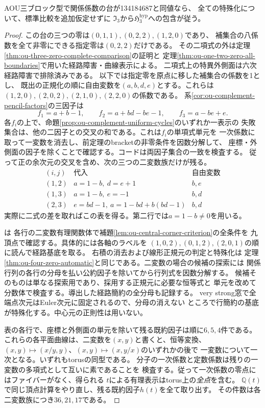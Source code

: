 \begin{theorem}
\label{thm:ou-three-zero-double-pencils}
AOU三ブロック型で関係係数の台が134184687と同値なら、
全ての特殊化について、標準比較を追加仮定せずに
$\mathfrak I_3$から$\mathfrak H^{\mathrm{hyp}}_3$への包含が従う。
\end{theorem}
\begin{proof}
この台の三つの零は$(0,1,1),(0,2,2),(1,2,0)$であり、
補集合の八係数を全て非零にできる指定零は$(0,2,2)$だけである。
その二項式の外は定理\ref{thm:ou-three-zero-complete-comparison}の証明と
定理\ref{thm:ou-one-two-zero-all-boundaries}で用いた経路障害・曲線表示による。
二項式上の特異外側面は六次経路障害で排除済みである。
以下では指定零を原点に移した補集合の係数を1とし、
既出の正規化の順に自由変数を$(a,b,d,e)$とする。これらは
$(1,2,0),(2,0,2),(2,1,0),(2,2,0)$の係数である。
系\ref{cor:ou-complement-pencil-factors}の三因子は
\[
 f_1=a+b-1,\qquad f_2=a+bd-be-1,\qquad f_3=a-be+e.
\]
各$f_i$の上で、命題\ref{prop:ou-complement-uniform-cycles}のいずれか一表示の
失敗集合は、他の二因子との交叉の和である。これは$f_i$の単項式単元を
一次係数に取って一変数を消去し、前定理のbracketの非零条件を因数分解して、
座標・外側面の因子を除くことで確認する。コードは両因子集合の一致を検査する。
従って正の余次元の交叉を含め、次の三つの二変数族だけが残る。
\[
\begin{array}{c|c|c}
 (i,j)&\text{代入}&\text{自由変数}\\\hline
 (1,2)&a=1-b,\ d=e+1& b,e\\
 (1,3)&a=1-b,\ e=-1& b,d\\
 (2,3)&e=bd-1,\ a=1-bd+b(bd-1)& b,d
\end{array}
\]
実際に二式の差を取ればこの表を得る。第二行では$a=1-b\ne0$を用いる。

は
各行の二変数有理関数体で補題\ref{lem:ou-central-corner-criterion}の全条件を
九頂点で確認する。具体的には各軸のラベルを
$(1,0,2),(0,1,2),(2,0,1)$の順に読んで経路基底を取る。
右積の消去および線形正規元の判定と特殊化は
定理\ref{thm:ou-four-zero-automatic}と同じである。二変数の場合の候補の探索には
関係行列の各行の分母を払い公約因子を除いてから行列式を因数分解する。
候補そのものは単なる探索用であり、採用する正規元に必要な恒等式と
単元を改めて分数体で検査する。導出した経路簡約の全分母も記録する。
very strong窓で全端点次元はEuler次元に固定されるので、分母の消えない
ところで行簡約の基底が特殊化する。中心元の正則性は用いない。

表の各行で、座標と外側面の単元を除いて残る既約因子は順に$6,5,4$件である。
これらの各平面曲線は、二変数を$(x,y)$と書くと、恒等変換、
$(x,y)\mapsto(x/y,y)$、$(x,y)\mapsto(x,y/x)$のいずれかの後で
一変数について一次となる。いずれもtorusの同型である。
分子の一次係数と定数係数は残りの一変数の多項式として互いに素であることを
検査する。従って一次係数の零点にはファイバーがなく、得られる
$t$による有理表示はtorus上の\emph{全点}を含む。
$\mathbb Q(t)$で同じ頂点計算をやり直し、残る既約因子$h(t)$を全て取り出す。
その件数は各二変数族につき$36,21,17$である。


\end{proof}
